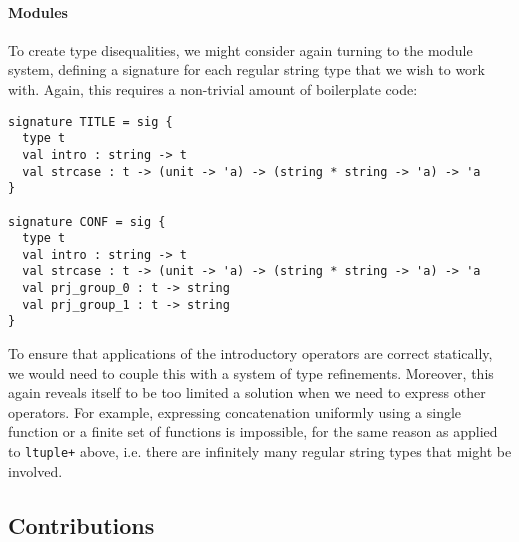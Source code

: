 

\paragraph{Modules}
To create type disequalities, we might consider again turning to the module system, defining a signature for each regular string type that we wish to work with. Again, this requires a non-trivial amount of boilerplate code:
\begin{lstlisting}[numbers=none]
signature TITLE = sig {
  type t
  val intro : string -> t
  val strcase : t -> (unit -> 'a) -> (string * string -> 'a) -> 'a
}

signature CONF = sig {
  type t
  val intro : string -> t
  val strcase : t -> (unit -> 'a) -> (string * string -> 'a) -> 'a
  val prj_group_0 : t -> string
  val prj_group_1 : t -> string
}
\end{lstlisting}

To ensure that applications of the introductory operators are correct statically, we would need to couple this with a system of type refinements. Moreover, this again reveals itself to be too limited a solution when we need to express other operators. For example, expressing concatenation uniformly using a single function or a finite set of functions is impossible, for the same reason as applied to \lstinline{ltuple+} above, i.e. there are infinitely many regular string types that might be involved.

\subsection{Contributions}\label{sec:metamodules-solution}


